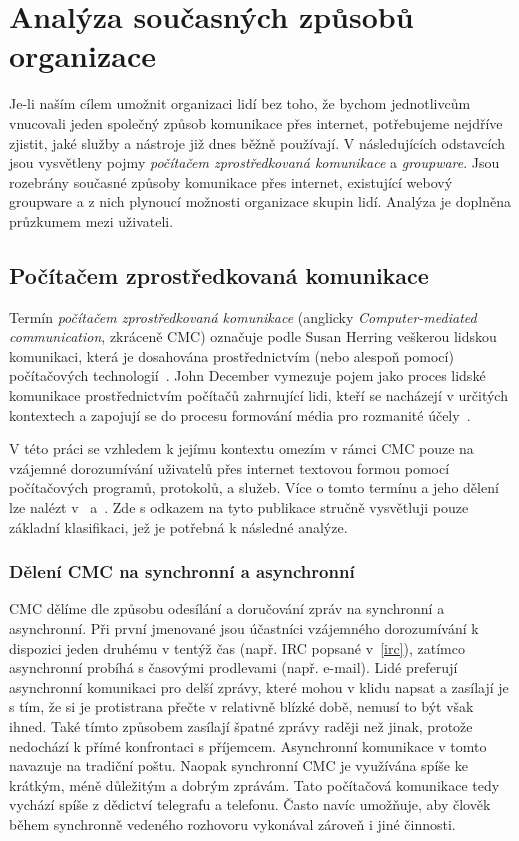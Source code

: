 \documentclass[12pt,oneside,final]{fithesis2}
\begin{document}
\chapter{Analýza současných způsobů organizace}\label{analysis}
Je-li naším cílem umožnit organizaci lidí bez toho, že bychom jednotlivcům vnucovali jeden společný způsob komunikace přes internet, potřebujeme nejdříve zjistit, jaké služby a nástroje již dnes běžně používají. V následujících odstavcích jsou vysvětleny pojmy \emph{počítačem zprostředkovaná komunikace} a \emph{groupware}. Jsou rozebrány současné způsoby komunikace přes internet, existující webový groupware a z nich plynoucí možnosti organizace skupin lidí. Analýza je doplněna průzkumem mezi uživateli.


\section{Počítačem zprostředkovaná komunikace}\label{cmc}
Termín \emph{počítačem zprostředkovaná komunikace} (anglicky \emph{Computer-mediated communication}, zkráceně CMC) označuje podle Susan Herring veškerou lidskou komunikaci, která je dosahována prostřednictvím (nebo alespoň pomocí) počítačových technologií~\cite{thurlow2004computer}. John December vymezuje pojem jako proces lidské komunikace prostřednictvím počítačů zahrnující lidi, kteří se nacházejí v určitých kontextech a zapojují se do procesu formování média pro rozmanité účely~\cite{december1997notes}.

V této práci se vzhledem k jejímu kontextu omezím v rámci CMC pouze na vzájemné dorozumívání uživatelů přes internet textovou formou pomocí počítačových programů, protokolů, a služeb. Více o tomto termínu a jeho dělení lze nalézt v~\cite{thurlow2004computer} a~\cite{rulik2006computer}. Zde s odkazem na tyto publikace stručně vysvětluji pouze základní klasifikaci, jež je potřebná k následné analýze.

\subsection{Dělení CMC na synchronní a asynchronní}
CMC dělíme dle způsobu odesílání a doručování zpráv na synchronní a asynchronní. Při první jmenované jsou účastníci vzájemného dorozumívání k dispozici jeden druhému v tentýž čas (např. IRC popsané v~\ref{irc}), zatímco asynchronní probíhá s časovými prodlevami (např. e-mail). Lidé preferují asynchronní komunikaci pro delší zprávy, které mohou v klidu napsat a zasílají je s tím, že si je protistrana přečte v relativně blízké době, nemusí to být však ihned. Také tímto způsobem zasílají špatné zprávy raději než jinak, protože nedochází k přímé konfrontaci s příjemcem. Asynchronní komunikace v tomto navazuje na tradiční poštu. Naopak synchronní CMC je využívána spíše ke krátkým, méně důležitým a dobrým zprávám. Tato počítačová komunikace tedy vychází spíše z dědictví telegrafu a telefonu. Často navíc umožňuje, aby člověk během synchronně vedeného rozhovoru vykonával zároveň i jiné činnosti.
\end{document}

